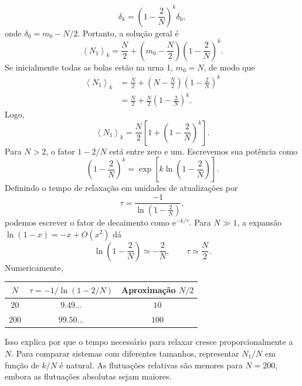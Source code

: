 \documentclass[12pt,a4paper]{article}
\newcommand{\avg}[1]{\left\langle #1\right\rangle}
\newcommand{\e}[1]{\mathrm{e}^{#1}}
\begin{document}
%
\begin{equation}
  \delta_k=\left(1-\frac{2}{N}\right)^k\delta_0,
\end{equation}
%
onde $\delta_0=m_0-N/2$. Portanto, a solução geral é
%
\begin{equation}
  \boxed{\avg{N_1}_k=\frac{N}{2}+\left(m_0-\frac{N}{2}\right)\left(1-\frac{2}{N}\right)^k.}
  \label{eq:generalsolution}
\end{equation}
%
Se inicialmente todas as bolas estão na urna 1, $m_0=N$, de modo que
%
\begin{align}
  \avg{N_1}_k
  &=\frac{N}{2}+\left(N-\frac{N}{2}\right)\left(1-\frac{2}{N}\right)^k\nonumber\\
  &=\frac{N}{2}+\frac{N}{2}\left(1-\frac{2}{N}\right)^k.
\end{align}
%
Logo,
%
\begin{equation}
  \boxed{\avg{N_1}_k=\frac{N}{2}\left[1+\left(1-\frac{2}{N}\right)^k\right].}
  \label{eq:initialall}
\end{equation}
%
Para $N>2$, o fator $1-2/N$ está entre zero e um. Escrevemos sua potência como
\[
\left(1-\frac{2}{N}\right)^k=\exp\left[k\ln\left(1-\frac{2}{N}\right)\right].
\]
Definindo o tempo de relaxação em unidades de atualizações por
%
\begin{equation}
  \tau=\frac{-1}{\ln\left(1-\frac{2}{N}\right)},
  \label{eq:tau}
\end{equation}
%
podemos escrever o fator de decaimento como $\e{-k/\tau}$. Para $N\gg1$, a expansão $\ln(1-x)=-x+O(x^2)$ dá
%
\begin{equation}
  \ln\left(1-\frac{2}{N}\right)\simeq -\frac{2}{N},
  \qquad
  \tau\simeq\frac{N}{2}.
\end{equation}
%
Numericamente,
%
\begin{center}
\begin{tabular}{@{}ccc@{}}
\toprule
$N$ & $\tau=-1/\ln(1-2/N)$ & Aproximação $N/2$\\
\midrule
$20$ & $9.49\ldots$ & $10$\\
$200$ & $99.50\ldots$ & $100$\\
\bottomrule
\end{tabular}
\end{center}
%
Isso explica por que o tempo necessário para relaxar cresce proporcionalmente a $N$. Para comparar sistemas com diferentes tamanhos, representar $N_1/N$ em função de $k/N$ é natural. As flutuações relativas são menores para $N=200$, embora as flutuações absolutas sejam maiores.
\end{document}
